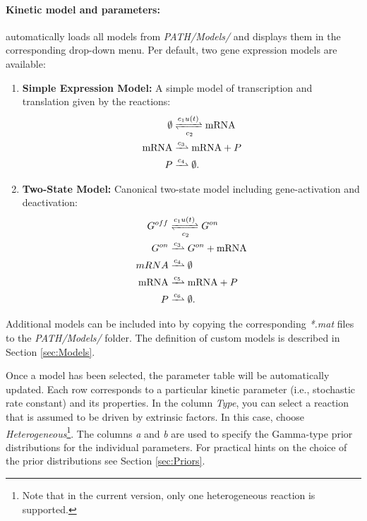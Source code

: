 \documentclass[a4paper, 9pt]{scrartcl}
\begin{document}
\paragraph{Kinetic model and parameters:} \GuiDPP automatically loads all models from \textit{PATH/Models/} and displays them in the corresponding drop-down menu. Per default, two gene expression models are available:
\begin{enumerate}
	\item \textbf{Simple Expression Model:} A simple model of transcription and translation given by the reactions:
		\begin{equation}
			\begin{split}
			\emptyset &\xrightleftharpoons[\kparameter_{2}]{\kparameter_{1} u(t) } \text{mRNA} \\
	\text{mRNA} &\xrightharpoonup{\kparameter_3} \text{mRNA} + P \\
	P &\xrightharpoonup{\kparameter_4} \emptyset. \nonumber
			\end{split}
		\end{equation}
	\item \textbf{Two-State Model:} Canonical two-state model including gene-activation and deactivation:
	 	\begin{equation}
			\begin{split}
			G^{off} &\xrightleftharpoons[\kparameter_{2}]{\kparameter_{1} u(t) } G^{on} \\
			G^{on} &\xrightharpoonup{\kparameter_3} G^{on} +  \text{mRNA} \\
			mRNA &\xrightharpoonup{\kparameter_4} \emptyset \\
	\text{mRNA} &\xrightharpoonup{\kparameter_5} \text{mRNA} + P \\
	P &\xrightharpoonup{\kparameter_6} \emptyset. \nonumber
			\end{split}
		\end{equation}
\end{enumerate}
Additional models can be included into \GuiDPP by copying the corresponding \textit{*.mat} files to the \textit{PATH/Models/} folder. The definition of custom models is described in Section \ref{sec:Models}. \newline

Once a model has been selected, the parameter table will be automatically updated. Each row corresponds to a particular kinetic parameter (i.e., stochastic rate constant) and its properties. In the column \textit{Type}, you can select a reaction that is assumed to be driven by extrinsic factors. In this case, choose \textit{Heterogeneous}\footnote{Note that in the current version, only one heterogeneous reaction is supported.}. The columns \textit{a} and \textit{b} are used to specify the Gamma-type prior distributions for the individual parameters. For practical hints on the choice of the prior distributions see Section \ref{sec:Priors}.
\end{document}

